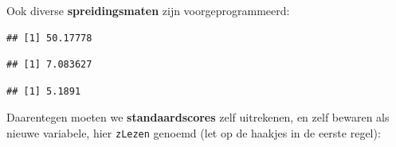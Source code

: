 \documentclass[
]{book}
\newenvironment{Shaded}{\begin{snugshade}}{\end{snugshade}}
\newcommand{\CommentTok}[1]{\textcolor[rgb]{0.56,0.35,0.01}{\textit{#1}}}
\newcommand{\FunctionTok}[1]{\textcolor[rgb]{0.13,0.29,0.53}{\textbf{#1}}}
\newcommand{\NormalTok}[1]{#1}
\newcommand{\OtherTok}[1]{\textcolor[rgb]{0.56,0.35,0.01}{#1}}
\newcommand{\SpecialCharTok}[1]{\textcolor[rgb]{0.81,0.36,0.00}{\textbf{#1}}}
\begin{document}
Ook diverse \textbf{spreidingsmaten} zijn voorgeprogrammeerd:

\begin{Shaded}
\end{Shaded}

\begin{verbatim}
## [1] 50.17778
\end{verbatim}

\begin{Shaded}
\end{Shaded}

\begin{verbatim}
## [1] 7.083627
\end{verbatim}

\begin{Shaded}
\end{Shaded}

\begin{verbatim}
## [1] 5.1891
\end{verbatim}

Daarentegen moeten we \textbf{standaardscores} zelf uitrekenen, en zelf bewaren als nieuwe variabele, hier \texttt{zLezen} genoemd (let op de haakjes in de eerste regel):

\begin{Shaded}
\end{Shaded}
\end{document}
